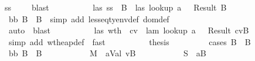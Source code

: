 \begin{isabellebody}
\ \ \ \ \ \ \ \ \ \ ss{\isacharcolon}\ {\isachardoublequoteopen}{\isasymSigma}{\isacharprime}\ {\isasymsqsubseteq}\ {\isasymSigma}{\isachardoublequoteclose}\ \isamarkupfalse \ blast\ \isamarkupfalse \isanewline
\ \ \ \ \ \ \ \ \isamarkupfalse \ las\ ss\ \isamarkupfalse \ B{}\ \ las{}{\isacharcolon}\ {\isachardoublequoteopen}lookup\ a\ {\isasymSigma}{\isacharprime}\ {\isacharequal}\ Result\ B{}{\isachardoublequoteclose}\isanewline
\ \ \ \ \ \ \ \ \ \ \ bb{}{\isacharcolon}\ {\isachardoublequoteopen}B{}\ {\isasymsqsubseteq}\ B{\isachardoublequoteclose}\ \isamarkupfalse \ {\isacharparenleft}simp\ add{\isacharcolon}\ lesseq{\isacharunderscore}tyenv{\isacharunderscore}def\ dom{\isacharunderscore}def{\isacharparenright}\isanewline
\ \ \ \ \ \ \ \ \ \ \isamarkupfalse \ auto\ \isamarkupfalse \ blast\ \isamarkupfalse \isanewline
\ \ \ \ \ \ \ \ \isamarkupfalse \ las{}\ wth{}\ \isamarkupfalse \ cv{}\ \ lam{}{\isacharcolon}\ {\isachardoublequoteopen}lookup\ a\ {\isasymmu}{\isacharprime}\ {\isacharequal}\ Result\ {\isacharparenleft}cv{}{\isacharcomma}B{}{\isacharparenright}{\isachardoublequoteclose}\ \isanewline
\ \ \ \ \ \ \ \ \ \ \isamarkupfalse \ {\isacharparenleft}simp\ add{\isacharcolon}\ wt{\isacharunderscore}heap{\isacharunderscore}def{\isacharparenright}\ \isamarkupfalse \ fast\ \isamarkupfalse \isanewline
\ \ \ \ \ \ \ \ \isamarkupfalse \ {\isacharquery}thesis\isanewline
\ \ \ \ \ \ \ \ \isamarkupfalse \ {\isacharparenleft}cases\ {\isachardoublequoteopen}B\ {\isasymsqsubseteq}\ B{}{\isachardoublequoteclose}{\isacharparenright}\isanewline
\ \ \ \ \ \ \ \ \ \ \isamarkupfalse \ b{}b{\isacharcolon}\ {\isachardoublequoteopen}B\ {\isasymsqsubseteq}\ B{}{\isachardoublequoteclose}\isanewline
\ \ \ \ \ \ \ \ \ \ \isamarkupfalse \ {\isacharquery}M{}\ {\isacharequal}\ {\isachardoublequoteopen}{\isacharparenleft}a{\isacharcomma}{\isacharparenleft}Val\ v{\isacharprime}{\isacharcomma}B{\isacharparenright}{\isacharparenright}{\isacharhash}{\isasymmu}{\isacharprime}{\isachardoublequoteclose}\isanewline
\ \ \ \ \ \ \ \ \ \ \isamarkupfalse \ {\isacharquery}S{}\ {\isacharequal}\ {\isachardoublequoteopen}{\isacharparenleft}a{\isacharcomma}B{\isacharparenright}{\isacharhash}{\isasymSigma}{\isacharprime}{\isachardoublequoteclose}\isanewline

\end{isabellebody}
